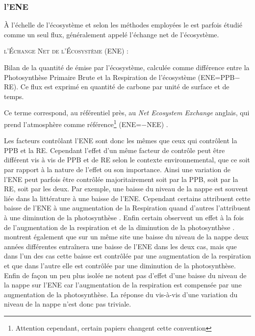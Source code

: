 \subsubsection{l'ENE}

À l'échelle de l'écosystème et selon les méthodes employées le \coo est parfois étudié comme un seul flux, généralement appelé l'échange net de l'écosystème.

\begin{pdef}
\textsc{l'Échange Net de l'Écosystème (ENE)} :

Bilan de la quantité de \coo émise par l'écosystème, calculée comme  différence entre la Photosynthèse Primaire Brute et la Respiration de l'écosystème (ENE=PPB$-$RE).
Ce flux est exprimé en quantité de carbone par unité de surface et de temps.
\end{pdef}
Ce terme correspond, au référentiel près, au \textit{Net Ecosystem Exchange} anglais, qui prend l'atmosphère comme référence\footnote{Attention cependant, certain papiers changent cette convention} (ENE=$-$NEE) \citep{chapin2006}.

Les facteurs contrôlant l'ENE sont donc les mêmes que ceux qui contrôlent la PPB et la RE.
Cependant l'effet d'un même facteur de contrôle peut être différent vis à vis de PPB et de RE selon le contexte environnemental, que ce soit par rapport à la nature de l'effet ou son importance.
Ainsi une variation de l'ENE peut parfois être contrôlée majoritairement soit par la PPB, soit par la RE, soit par les deux.
Par exemple, une baisse du niveau de la nappe est souvent liée dans la littérature à une baisse de l'ENE.
Cependant certains attribuent cette baisse de l'ENE à une augmentation de la Respiration \citep{alm1999, ise2008} quand d'autres l'attribuent à une diminution de la photosynthèse \citep{sonnentag2010,peichl2014}.
Enfin certain observent un effet à la fois de l'augmentation de la respiration et de la diminution de la photosynthèse \citep{strack2013}.
\citet{lund2012} montrent également que sur un même site une baisse du niveau de la nappe deux années différentes entraînera une baisse de l'ENE dans les deux cas, mais que dans l'un des cas cette baisse est contrôlée par une augmentation de la respiration et que dans l'autre elle est contrôlée par une diminution de la photosynthèse.
Enfin de façon un peu plus isolée \citet{ballantyne2014} ne notent pas d'effet d'une baisse du niveau de la nappe sur l'ENE car l'augmentation de la respiration est compensée par une augmentation de la photosynthèse.
La réponse du \coo vis-à-vis d'une variation du niveau de la nappe n'est donc pas triviale.

